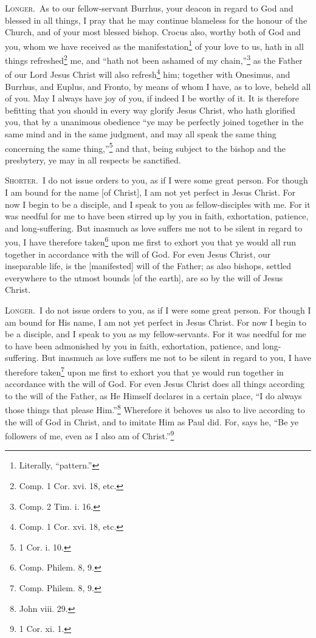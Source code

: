 \textsc{Longer.}~As to our fellow-servant Burrhus, your deacon in regard to God and blessed in all things, I pray that he may continue blameless for the honour of the Church, and of your most blessed bishop. Crocus also, worthy both of God and you, whom we have received as the manifestation\footnote{Literally, “pattern.”} of your love to us, hath in all things refreshed\footnote{Comp. 1 Cor. xvi. 18, etc.} me, and “hath not been ashamed of my chain,”\footnote{Comp. 2 Tim. i. 16.} as the Father of our Lord Jesus Christ will also refresh\footnote{Comp. 1 Cor. xvi. 18, etc.} him; together with Onesimus, and Burrhus, and Euplus, and Fronto, by means of whom I have, as to love, beheld all of you. May I always have joy of you, if indeed I be worthy of it. It is therefore befitting that you should in every way glorify Jesus Christ, who hath glorified you, that by a unanimous obedience “ye may be perfectly joined together in the same mind and in the same judgment, and may all speak the same thing concerning the same thing,”\footnote{1 Cor. i. 10.} and that, being subject to the bishop and the presbytery, ye may in all respects be sanctified.


\textsc{Shorter.}~I do not issue orders to you, as if I were some great person. For though I am bound for the name [of Christ], I am not yet perfect in Jesus Christ. For now I begin to be a disciple, and I speak to you as fellow-disciples with me. For it was needful for me to have been stirred up by you in faith, exhortation, patience, and long-suffering. But inasmuch as love suffers me not to be silent in regard to you, I have therefore taken\footnote{Comp. Philem. 8, 9.} upon me first to exhort you that ye would all run together in accordance with the will of God. For even Jesus Christ, our inseparable life, is the [manifested] will of the Father; as also bishops, settled everywhere to the utmost bounds [of the earth], are so by the will of Jesus Christ.

\textsc{Longer.}~I do not issue orders to you, as if I were some great person. For though I am bound for His name, I am not yet perfect in Jesus Christ. For now I begin to be a disciple, and I speak to you as my fellow-servants. For it was needful for me to have been admonished by you in faith, exhortation, patience, and long-suffering. But inasmuch as love suffers me not to be silent in regard to you, I have therefore taken\footnote{Comp. Philem. 8, 9.} upon me first to exhort you that ye would run together in accordance with the will of God. For even Jesus Christ does all things according to the will of the Father, as He Himself declares in a certain place, “I do always those things that please Him.”\footnote{John viii. 29.} Wherefore it behoves us also to live according to the will of God in Christ, and to imitate Him as Paul did. For, says he, “Be ye followers of me, even as I also am of Christ.”\footnote{1 Cor. xi. 1.}

